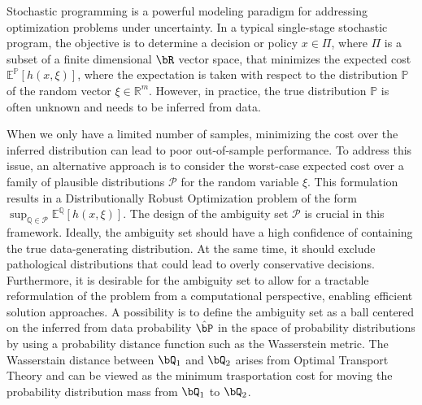 \documentclass[11pt,a4paper,oneside,openany]{book}
\numberwithin{definition}{section}
\numberwithin{theorem}{section}
\numberwithin{problem}{section}
\begin{document}
Stochastic programming is a powerful modeling paradigm for addressing optimization problems under uncertainty. In a typical single-stage stochastic program, the objective is to determine a decision or policy $x \in \Pi$, where $\Pi$ is a subset of a finite dimensional $\bR$ vector space, that minimizes the expected cost $\mathbb{E}^{\mathbb{P}}[h(x,\xi)]$, where the expectation is taken with respect to the distribution $\mathbb{P}$ of the random vector $\xi \in \mathbb{R}^m$. However, in practice, the true distribution $\mathbb{P}$ is often unknown and needs to be inferred from data.
\par
When we only have a limited number of samples, minimizing the cost over the inferred distribution can lead to poor out-of-sample performance. To address this issue, an alternative approach is to consider the worst-case expected cost over a family of plausible distributions $\mathcal{P}$ for the random variable $\xi$. This formulation results in a Distributionally Robust Optimization problem of the form $\sup_{\mathbb{Q} \in \mathcal{P}}\mathbb{E}^{\mathbb{Q}}[h(x,\xi)]$. The design of the ambiguity set $\mathcal{P}$ is crucial in this framework. Ideally, the ambiguity set should have a high confidence of containing the true data-generating distribution. At the same time, it should exclude pathological distributions that could lead to overly conservative decisions. Furthermore, it is desirable for the ambiguity set to allow for a tractable reformulation of the problem from a computational perspective, enabling efficient solution approaches. A possibility is to define the ambiguity set as a ball centered on the inferred from data probability $\hat{\bP}$ in the space of probability distributions by using a probability distance function such as the Wasserstein metric. The Wasserstain distance between $\bQ_1$ and $\bQ_2$ arises from Optimal Transport Theory and can be viewed as the minimum trasportation cost for moving the probability distribution mass from $\bQ_1$ to $\bQ_2$.
\end{document}
